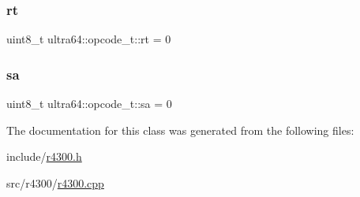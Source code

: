 \mbox{\label{classultra64_1_1opcode__t_a5e472884ffb0c969514280934cb3a17d}} 
\subsubsection{\texorpdfstring{rt}{rt}}
{\footnotesize\ttfamily uint8\+\_\+t ultra64\+::opcode\+\_\+t\+::rt = 0}

\mbox{\label{classultra64_1_1opcode__t_a19605b9e9c4cd00b783db1411556cab4}} 
\subsubsection{\texorpdfstring{sa}{sa}}
{\footnotesize\ttfamily uint8\+\_\+t ultra64\+::opcode\+\_\+t\+::sa = 0}



The documentation for this class was generated from the following files\+:\begin{DoxyCompactItemize}
\item 
include/\hyperlink{r4300_8h}{r4300.\+h}\item 
src/r4300/\hyperlink{r4300_8cpp}{r4300.\+cpp}\end{DoxyCompactItemize}
